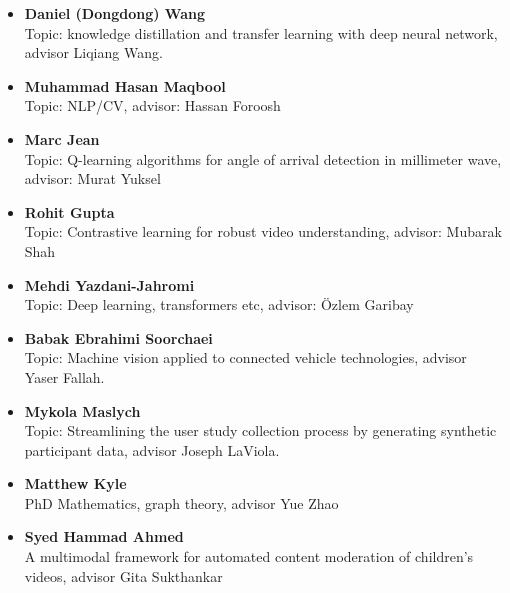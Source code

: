 \begin{itemize}

\item\textbf{Daniel (Dongdong) Wang} \\
Topic: knowledge distillation and transfer learning with deep neural network, advisor Liqiang Wang.

\item\textbf{Muhammad Hasan Maqbool} \\
Topic: NLP/CV, advisor: Hassan Foroosh 

\item\textbf{Marc Jean} \\
Topic: Q-learning algorithms for angle of arrival detection in millimeter wave, advisor: Murat Yuksel

\item\textbf{Rohit Gupta}\\
Topic: Contrastive learning for robust video understanding, advisor: Mubarak Shah

\item\textbf{Mehdi Yazdani-Jahromi} \\
Topic: Deep learning, transformers etc, advisor: Özlem Garibay 

\item\textbf{Babak Ebrahimi Soorchaei} \\
Topic: Machine vision applied to connected vehicle technologies, advisor Yaser Fallah.

\item\textbf{Mykola Maslych} \\
Topic: Streamlining the user study collection process by generating synthetic participant data, advisor Joseph LaViola. 

\item\textbf{Matthew Kyle} \\
PhD Mathematics, graph theory, advisor Yue Zhao 

\item\textbf{Syed Hammad Ahmed} \\
A multimodal framework for automated content moderation of children's videos, advisor Gita Sukthankar
    

\end{itemize}

